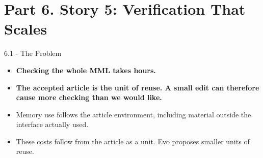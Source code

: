 \documentclass[aspectratio=169,11pt]{beamer}
\begin{document}
\section{Part 6. Story 5: Verification That Scales}
\begin{frame}[fragile,t]{6.1 - The Problem}
\begin{itemize}
\setlength{\itemsep}{1pt}
\setlength{\parsep}{0pt}
\setlength{\parskip}{0pt}
\item \textcolor{blue!55!black}{\textbf{Checking the whole MML takes hours.}}
\item \textcolor{blue!55!black}{\textbf{The accepted article is the unit of reuse. A small edit can therefore cause more checking than we would like.}}
\item Memory use follows the article environment, including material outside the interface actually used.
\item These costs follow from the article as a unit. Evo proposes smaller units of reuse.
\end{itemize}
\end{frame}
\end{document}
